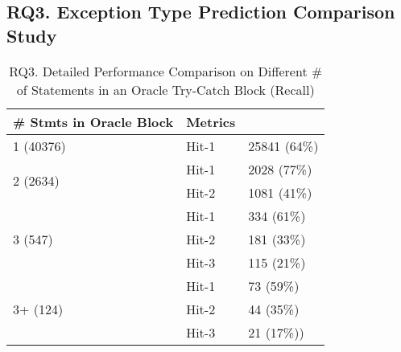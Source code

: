 \subsection{RQ3. Exception Type Prediction Comparison Study }
\label{sec:rq3}


\begin{table}[t]
	\caption{RQ3. Detailed Performance Comparison on Different \# of Statements in an Oracle Try-Catch Block (Recall)}
	\tabcolsep 2pt
	{\small
		\begin{center}
			\renewcommand{\arraystretch}{1}
			\begin{tabular}{p{3cm}<{\centering}|p{2cm}<{\centering}|p{2cm}<{\centering}}
				\hline
				\# Stmts in Oracle Block& Metrics& {\textsc{\tool}\xspace} \\
				\hline
				\multirow{1}{*}{1 (40376)}   & Hit-1  & 25841 (64\%) \\
				\hline
				\multirow{2}{*}{2 (2634)}  & Hit-1   & 2028 (77\%) \\
				& Hit-2         &  1081 (41\%) \\
				\hline
				\multirow{3}{*}{3 (547)}  & Hit-1    & 334 (61\%) \\
				& Hit-2     & 181 (33\%)\\
				& Hit-3     & 115 (21\%) \\
				\hline
				\multirow{4}{*}{3+ (124)}  & Hit-1   & 73 (59\%) \\
				& Hit-2     & 44 (35\%) \\
				& Hit-3     & 21 (17\%))\\
				\hline
			\end{tabular}		
			\label{RQ3_results_1}
		\end{center}
	}
\end{table}

{\color{red}{1. Our model do well on hit-1 condition which means in most cases, our model can at least predict one exception type correctly for a try-catch block. 2. Results show that the more exception types one try-catch block has, our model is harder to predict all of the correct. }}



